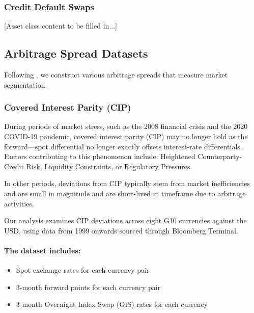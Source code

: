 \documentclass{article}
\begin{document}
\begin{appendices}
\subsubsection{Credit Default Swaps}
\label{sec:cds}

[Asset class content to be filled in...]

\subsection{Arbitrage Spread Datasets}
\label{sec:arbitrage}


Following \cite{Siriwardane2021}, we construct various arbitrage spreads that measure market segmentation.

\subsubsection{Covered Interest Parity (CIP)}
     

During periods of market stress, such as the 2008 financial crisis and the 2020 COVID-19
pandemic, covered interest parity (CIP) may no longer hold as the forward---spot differential 
no longer exactly offsets interest-rate differentials. Factors contributing to this phenomenon include:
Heightened Counterparty-Credit Risk, Liquidity Constraints, or Regulatory Pressures.

In other periods, deviations from CIP typically stem from market inefficiencies and are 
small in magnitude and are short-lived in timeframe due to arbitrage activities.

Our analysis examines CIP deviations across eight G10 currencies against the USD, 
using data from 1999 onwards sourced through Bloomberg Terminal.

\paragraph{The dataset includes:}
\begin{itemize}
    \item Spot exchange rates for each currency pair
    \item 3-month forward points for each currency pair
    \item 3-month Overnight Index Swap (OIS) rates for each currency
\end{itemize}


\end{appendices}
\end{document}
